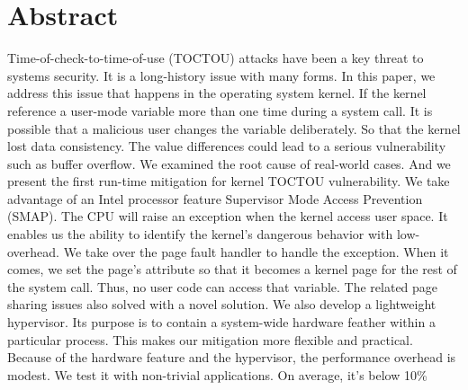 \section{Abstract}

Time-of-check-to-time-of-use (TOCTOU) attacks have been a key threat to systems security. It is a long-history issue with many forms. In this paper, we address this issue that happens in the operating system kernel. If the kernel reference a user-mode variable more than one time during a system call. It is possible that a malicious user changes the variable deliberately. So that the kernel lost data consistency. The value differences could lead to a serious vulnerability such as buffer overflow.  We examined the root cause of real-world cases. And we present the first run-time mitigation for kernel TOCTOU vulnerability. We take advantage of an Intel processor feature Supervisor Mode Access Prevention (SMAP). The CPU will raise an exception when the kernel access user space. It enables us the ability to identify the kernel's dangerous behavior with low-overhead. We take over the page fault handler to handle the exception. When it comes, we set the page's attribute so that it becomes a kernel page for the rest of the system call.  Thus, no user code can access that variable. The related page sharing issues also solved with a novel solution. We also develop a lightweight hypervisor. Its purpose is to contain a system-wide hardware feather within a particular process.  This makes our mitigation more flexible and practical. Because of the hardware feature and the hypervisor, the performance overhead is modest. We test it with non-trivial applications. On average, it's below 10\%
